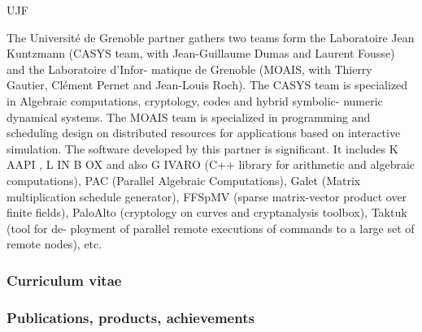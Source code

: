 \begin{sitedescription}{UJF}



The Université de Grenoble  partner gathers two teams form the Laboratoire Jean Kuntzmann
(CASYS team, with Jean-Guillaume Dumas and Laurent Fousse) and the Laboratoire d’Infor-
matique de Grenoble (MOAIS, with Thierry Gautier, Clément Pernet and Jean-Louis Roch). The
CASYS team is specialized in Algebraic computations, cryptology, codes and hybrid symbolic-
numeric dynamical systems. The MOAIS team is specialized in programming and scheduling
design on distributed resources for applications based on interactive simulation. The software
developed by this partner is significant. It includes K AAPI , L IN B OX and also G IVARO (C++
library for arithmetic and algebraic computations), PAC (Parallel Algebraic Computations),
Galet (Matrix multiplication schedule generator), FFSpMV (sparse matrix-vector product over
finite fields), PaloAlto (cryptology on curves and cryptanalysis toolbox), Taktuk (tool for de-
ployment of parallel remote executions of commands to a large set of remote nodes), etc.
\subsubsection*{Curriculum vitae}





%

\subsubsection*{Publications, products, achievements}


\end{sitedescription}
